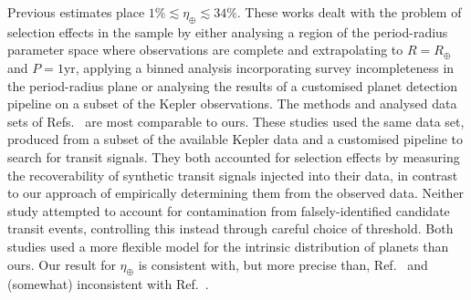 \documentclass{nature}
\newcommand{\etaearth}{\eta_\oplus}
\newcommand{\REarth}{R_\oplus}
\begin{document}
Previous
estimates\cite{Catanzarite2011,Traub2012,Dong2013,Petigura2013,Foreman-Mackey2014}
place $1\% \lesssim \etaearth \lesssim 34\%$.  These works dealt with
the problem of selection effects in the sample by either analysing a
region of the period-radius parameter space where observations are
complete and extrapolating to $R = \REarth$ and $P = 1
\mathrm{yr}$\cite{Catanzarite2011,Traub2012}, applying a binned
analysis incorporating survey incompleteness in the period-radius
plane\cite{Dong2013,Petigura2013} or analysing the results of a
customised planet detection pipeline on a subset of the Kepler
observations\cite{Petigura2013,Foreman-Mackey2014}.  The methods and
analysed data sets of Refs.\ \cite{Petigura2013,Foreman-Mackey2014}
are most comparable to ours.  These studies used the same data set,
produced\cite{Petigura2013} from a subset of the available Kepler data
and a customised pipeline to search for transit signals.  They both
accounted for selection effects by measuring the recoverability of
synthetic transit signals injected into their data, in contrast to our
approach of empirically determining them from the observed data.
Neither study attempted to account for contamination from
falsely-identified candidate transit events, controlling this instead
through careful choice of threshold.  Both studies used a more
flexible model for the intrinsic distribution of planets than ours.
Our result for $\etaearth$ is consistent with, but more precise than,
Ref.\ \cite{Foreman-Mackey2014} and (somewhat) inconsistent with
Ref.\ \cite{Petigura2013}.
\end{document}
